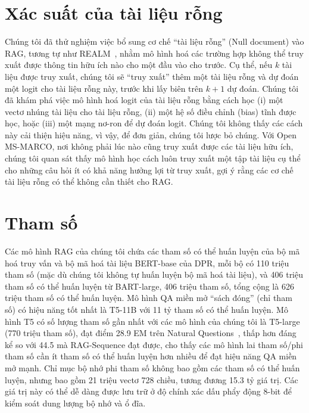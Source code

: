 \documentclass[10pt,letterpaper]{article}
\begin{document}
\section{Xác suất của tài liệu rỗng}

Chúng tôi đã thử nghiệm việc bổ sung cơ chế ``tài liệu rỗng'' (Null document)
vào RAG, tương tự như REALM~\cite{b20}, nhằm mô hình hoá các trường hợp không
thể truy xuất được thông tin hữu ích nào cho một đầu vào cho trước. Cụ thể, nếu
$k$ tài liệu được truy xuất, chúng tôi sẽ ``truy xuất'' thêm một tài liệu rỗng
và dự đoán một logit cho tài liệu rỗng này, trước khi lấy biên trên $k+1$ dự
đoán. Chúng tôi đã khám phá việc mô hình hoá logit của tài liệu rỗng bằng cách
học (i) một vectơ nhúng tài liệu cho tài liệu rỗng, (ii) một hệ số điều chỉnh
(bias) tĩnh được học, hoặc (iii) một mạng nơ-ron để dự đoán logit. Chúng tôi
không thấy các cách này cải thiện hiệu năng, vì vậy, để đơn giản, chúng tôi
lược bỏ chúng. Với Open MS-MARCO, nơi không phải lúc nào cũng truy xuất được
các tài liệu hữu ích, chúng tôi quan sát thấy mô hình học cách luôn truy xuất
một tập tài liệu cụ thể cho những câu hỏi ít có khả năng hưởng lợi từ truy
xuất, gợi ý rằng các cơ chế tài liệu rỗng có thể không cần thiết cho RAG.

\section{Tham số}

Các mô hình RAG của chúng tôi chứa các tham số có thể huấn luyện của bộ mã hoá
truy vấn và bộ mã hoá tài liệu BERT-base của DPR, mỗi bộ có 110 triệu tham số
(mặc dù chúng tôi không tự huấn luyện bộ mã hoá tài liệu), và 406 triệu tham số
có thể huấn luyện từ BART-large, 406 triệu tham số, tổng cộng là 626 triệu tham
số có thể huấn luyện. Mô hình QA miền mở ``sách đóng'' (chỉ tham số) có hiệu
năng tốt nhất là T5-11B với 11 tỷ tham số có thể huấn luyện. Mô hình T5 có số
lượng tham số gần nhất với các mô hình của chúng tôi là T5-large (770 triệu
tham số), đạt điểm 28.9 EM trên Natural Questions~\cite{b52}, thấp hơn đáng kể
so với 44.5 mà RAG-Sequence đạt được, cho thấy các mô hình lai tham số/phi tham
số cần ít tham số có thể huấn luyện hơn nhiều để đạt hiệu năng QA miền mở mạnh.
Chỉ mục bộ nhớ phi tham số không bao gồm các tham số có thể huấn luyện, nhưng
bao gồm 21 triệu vectơ 728 chiều, tương đương 15.3 tỷ giá trị. Các giá trị này
có thể dễ dàng được lưu trữ ở độ chính xác dấu phẩy động 8-bit để kiểm soát
dung lượng bộ nhớ và ổ đĩa.
\end{document}
